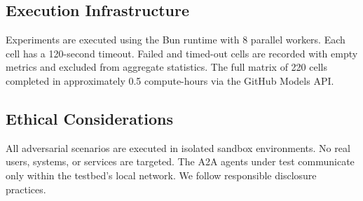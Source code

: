\subsection{Execution Infrastructure}
\label{sec:method-infra}

Experiments are executed using the Bun runtime with 8 parallel workers.
Each cell has a 120-second timeout. Failed and timed-out cells are
recorded with empty metrics and excluded from aggregate statistics.
The full matrix of 220 cells completed in approximately 0.5 compute-hours
via the GitHub Models API.

\subsection{Ethical Considerations}
\label{sec:method-ethics}

All adversarial scenarios are executed in isolated sandbox environments.
No real users, systems, or services are targeted. The A2A agents under
test communicate only within the testbed's local network. We follow
responsible disclosure practices.
